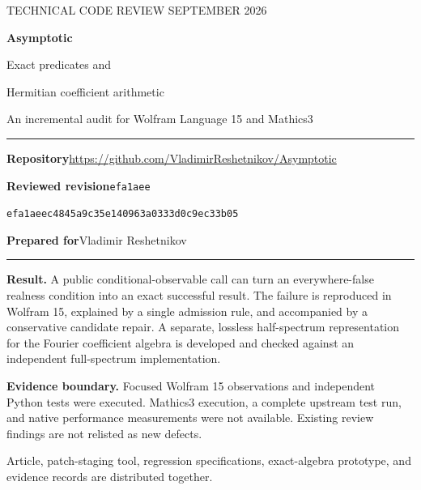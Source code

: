 \documentclass[11pt,letterpaper]{article}
\newcommand{\sha}{efa1aeec4845a9c35e140963a0333d0c9ec33b05}
\newcommand{\repo}{https://github.com/VladimirReshetnikov/Asymptotic}
\begin{document}
\begin{titlepage}
\thispagestyle{empty}
\vspace*{0.5in}
{\small TECHNICAL CODE REVIEW \quad\textbullet{} SEPTEMBER 2026\par}
\vspace{0.5in}
{\Huge\bfseries Asymptotic\par}
\vspace{0.14in}
{\LARGE Exact predicates and\par Hermitian coefficient arithmetic\par}
\vspace{0.35in}
{\large An incremental audit for Wolfram Language 15 and Mathics3\par}
\vspace{0.5in}
\hrule
\vspace{0.2in}
\noindent\textbf{Repository}\quad\url{\repo}\par
\noindent\textbf{Reviewed revision}\quad\texttt{efa1aee}\par
\noindent\texttt{\sha}\par
\noindent\textbf{Prepared for}\quad Vladimir Reshetnikov\par
\vspace{0.2in}
\hrule
\vspace{0.4in}
\noindent\textbf{Result.} A public conditional-observable call can turn an everywhere-false realness condition into an exact successful result. The failure is reproduced in Wolfram 15, explained by a single admission rule, and accompanied by a conservative candidate repair. A separate, lossless half-spectrum representation for the Fourier coefficient algebra is developed and checked against an independent full-spectrum implementation.

\noindent\textbf{Evidence boundary.} Focused Wolfram 15 observations and independent Python tests were executed. Mathics3 execution, a complete upstream test run, and native performance measurements were not available. Existing review findings are not relisted as new defects.
\vfill
{\small Article, patch-staging tool, regression specifications, exact-algebra prototype, and evidence records are distributed together.\par}
\end{titlepage}
\end{document}
